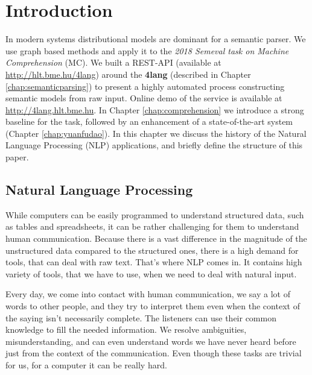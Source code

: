 \chapter{Introduction}
\label{chap:Introdu}
In modern systems distributional models are dominant for a semantic parser. We use graph based methods and apply it to the \textit{2018 Semeval task on Machine Comprehension} (MC). We built a REST-API (available at \url{http://hlt.bme.hu/4lang}) around the \textbf{4lang}\cite{Recski:2016} (described in Chapter \ref{chap:semanticparsing}) to present a highly automated process constructing semantic models from raw input. Online demo of the service is available at \url{http://4lang.hlt.bme.hu}. In Chapter \ref{chap:comprehension} we introduce a strong baseline for the task, followed by an enhancement of a state-of-the-art system \cite{Wang:2018} (Chapter \ref{chap:yuanfudao}). In this chapter we discuss the history of the Natural Language Processing (NLP) applications, and briefly define the structure of this paper.
\section{Natural Language Processing}
While computers can be easily programmed to understand structured data, such as tables and spreadsheets, it can be rather challenging for them
to understand human communication. Because there is a vast difference in the magnitude of the unstructured data compared to the structured ones, there is a high demand
for tools, that can deal with raw text. That's where NLP comes in. It contains high variety of tools, that we have to use, when we need to deal with natural input.

Every day, we come into contact with human communication, we say a lot of words to other people, and they try to interpret them even when the context of the saying 
isn't necessarily complete. The listeners can use their common knowledge to fill the needed information. We resolve ambiguities, misunderstanding, and can even understand words 
we have never heard before just from the context of the communication.
Even though these tasks are trivial for us, for a computer it can be really hard.

